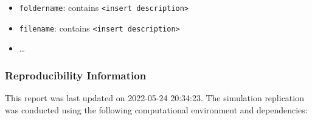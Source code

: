 \documentclass[10,a4paperpaper,]{article}
\begin{document}
\begin{itemize}
\tightlist
\item
  \texttt{foldername}: contains
  \texttt{\textless{}insert\ description\textgreater{}}
\item
  \texttt{filename}: contains
  \texttt{\textless{}insert\ description\textgreater{}}
\item
  \ldots{}
\end{itemize}

\subsubsection*{Reproducibility Information}

This report was last updated on 2022-05-24 20:34:23. The simulation
replication was conducted using the following computational environment
and dependencies:

\FloatBarrier
\end{document}
